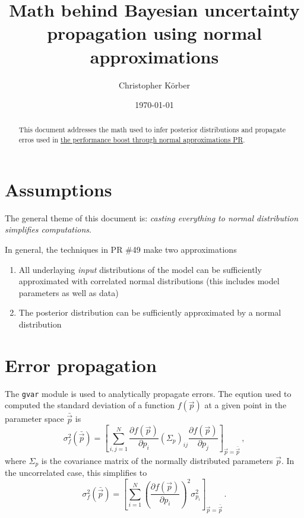 \documentclass[paper=a4, fontsize=12pt, prl, notitlepage]{revtex4-1}
\begin{document}
\title{Math behind Bayesian uncertainty propagation using normal approximations}
\author{Christopher Körber}
\date{\today}
\begin{abstract}
This document addresses the math used to infer posterior distributions and propagate erros used in \href{https://github.com/pennsignals/chime_sims/pull/49}{the performance boost through normal approximations PR}.
\end{abstract}

\maketitle




\section{Assumptions}
The general theme of this document is: \textit{casting everything to normal distribution simplifies computations}.

In general, the techniques in PR \#49 make two approximations
\begin{enumerate}
    \item All underlaying \textit{input} distributions of the model can be sufficiently approximated with correlated normal distributions (this includes model parameters as well as data)
    \item The posterior distribution can be sufficiently approximated by a normal distribution
\end{enumerate}

\section{Error propagation}
The \texttt{gvar} module is used to analytically propagate errors.
The eqution used to computed the standard deviation of a function $f(\vec p)$ at a given point in the parameter space $\bar {\vec p}$ is
\begin{equation}
    \sigma_f^2(\bar {\vec p})
    =
    \left[
        \sum_{i,j=1}^N
        \frac{\partial f(\vec p)}{\partial p_i}
        \left(\Sigma_p\right)_{ij}
        \frac{\partial f(\vec p)}{\partial p_j}
    \right]_{\vec p = \bar {\vec p}}
    \, ,
\end{equation}
where $\Sigma_p$ is the covariance matrix of the normally distributed parameters $\vec p$.
In the uncorrelated case, this simplifies to
\begin{equation}
    \sigma_f^2(\bar {\vec p})
    =
    \left[
        \sum_{i=1}^N
        \left(\frac{\partial f(\vec p)}{\partial p_i}\right)^2
        \sigma_{p_i}^2
    \right]_{\vec p = \bar {\vec p}}
    \, .
\end{equation}
\end{document}
